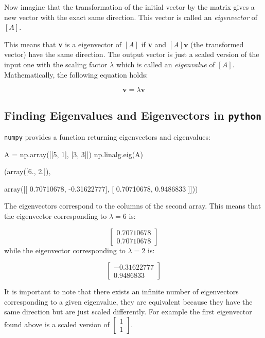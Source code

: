 Now imagine that the transformation of the initial vector by the matrix gives a new vector with the exact same direction. This vector is called an \emph{eigenvector} of $[A]$.

This means that \textbf{v} is a eigenvector of $[A]$ if \textbf{v} and $[A]\boldsymbol{v}$ (the transformed vector) have the same direction. The output vector is just a scaled version of the input one with the scaling factor $\lambda$ which is called an \emph{eigenvalue} of \([A]\). Mathematically, the following equation holds:

\begin{equation}
[A]\boldsymbol{v}=\lambda \boldsymbol{v}
\end{equation}

\subsection{Finding Eigenvalues and Eigenvectors in \texttt{python}}
\label{find-eigenvalues-and-eigenvectors-in-python}

\texttt{numpy} provides a function returning eigenvectors and eigenvalues: 

\begin{ipython}
A = np.array([[5, 1], [3, 3]])
np.linalg.eig(A)
\end{ipython}
\begin{ioutput}
(array([6., 2.]),

array([[ 0.70710678, -0.31622777],
       [ 0.70710678,  0.9486833 ]]))
\end{ioutput}
The eigenvectors correspond to the columns of the second array. This means that the eigenvector corresponding to \(\lambda=6\) is:

\begin{equation*}
\begin{bmatrix}
0.70710678 \\
0.70710678
\end{bmatrix}
\end{equation*}
while the eigenvector corresponding to $\lambda=2$ is:

\begin{equation*}
\begin{bmatrix}
−0.31622777 \\
0.9486833
\end{bmatrix}
\end{equation*}

It is important to note that there exists an infinite number of eigenvectors corresponding to a given eigenvalue, they are equivalent because they have the same direction but are just scaled differently. For example the first eigenvector found above is a scaled version of $\begin{bmatrix}1\\ 1\end{bmatrix}$.

